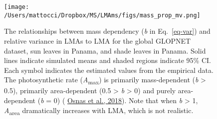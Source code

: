 \documentclass[
  12pt,
  a4paper,
,tablecaptionabove
]{scrartcl}
\providecommand{\DIFaddbeginFL}{} %
\providecommand{\DIFaddendFL}{} %
\providecommand{\DIFdelbeginFL}{} %
\providecommand{\DIFdelendFL}{} %
\newcommand{\DIFscaledelfig}{0.5}
\newlength{\DIFdelgraphicswidth} %
\newlength{\DIFdelgraphicsheight} %
\newcommand{\DIFaddincludegraphics}[2][]{{\color{blue}\fbox{\DIFOincludegraphics[#1]{#2}}}} %
\newcommand{\DIFdelincludegraphics}[2][]{%
\sbox{\DIFdelgraphicsbox}{\DIFOincludegraphics[#1]{#2}}%
\settoboxwidth{\DIFdelgraphicswidth}{\DIFdelgraphicsbox} %
\settoboxtotalheight{\DIFdelgraphicsheight}{\DIFdelgraphicsbox} %
\scalebox{\DIFscaledelfig}{%
\parbox[b]{\DIFdelgraphicswidth}{\usebox{\DIFdelgraphicsbox}\\[-\baselineskip] \rule{\DIFdelgraphicswidth}{0em}}\llap{\resizebox{\DIFdelgraphicswidth}{\DIFdelgraphicsheight}{%
\setlength{\unitlength}{\DIFdelgraphicswidth}%
\begin{picture}(1,1)%
\thicklines\linethickness{2pt} %
{\color[rgb]{1,0,0}\put(0,0){\framebox(1,1){}}}%
{\color[rgb]{1,0,0}\put(0,0){\line( 1,1){1}}}%
{\color[rgb]{1,0,0}\put(0,1){\line(1,-1){1}}}%
\end{picture}%
}\hspace*{3pt}}} %
} %
\DeclareRobustCommand{\DIFaddbeginFL}{\DIFOaddbeginFL \let\includegraphics\DIFaddincludegraphics} %
\DeclareRobustCommand{\DIFaddendFL}{\DIFOaddendFL \let\includegraphics\DIFOincludegraphics} %
\DeclareRobustCommand{\DIFdelbeginFL}{\DIFOdelbeginFL \let\includegraphics\DIFdelincludegraphics} %
\DeclareRobustCommand{\DIFdelendFL}{\DIFOaddendFL \let\includegraphics\DIFOincludegraphics} %
\begin{document}
\newpage

\begin{figure}

{\centering \DIFdelbeginFL %
\DIFdelendFL \DIFaddbeginFL \texttt{[image: /Users/mattocci/Dropbox/MS/LMAms/figs/mass\_prop\_mv.png]}
\DIFaddendFL 

}

\caption{\label{fig-massplt}The relationships between mass dependency
(\emph{b} in Eq.~\ref{eq-var}) and relative variance in LMAs to LMA for
the global GLOPNET dataset, sun leaves in Panama, and shade leaves in
Panama. Solid lines indicate simulated means and shaded regions indicate
95\% CI. Each symbol indicates the estimated values from the empirical
data. The photosynthetic rate (\emph{A}\textsubscript{max}) is primarily
mass-dependent (\emph{b} \textgreater{} 0.5), primarily area-dependent
(0.5 \textgreater{} \emph{b} \textgreater{} 0) and purely area-dependent
(\emph{b} = 0) (\protect\DIFdelbeginFL %
\DIFdelendFL \DIFaddbeginFL \hyperlink{ref-Osnas2018}{Osnas et al., 2018}\DIFaddendFL ).
Note that when \emph{b} \textgreater{} 1, \emph{A}\textsubscript{area}
dramatically increases with LMA, which is not realistic.}

\end{figure}

\newpage
\end{document}

